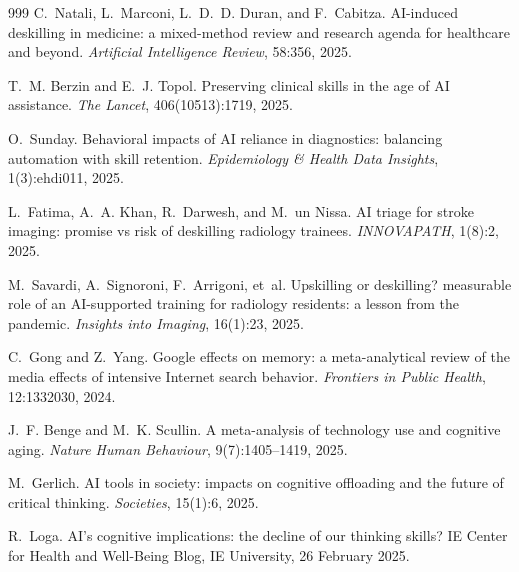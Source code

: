 \begin{thebibliography}{999}
C.~Natali, L.~Marconi, L.~D.~D. Duran, and F.~Cabitza.
\newblock AI-induced deskilling in medicine: a mixed-method review and research agenda for healthcare and beyond.
\newblock \emph{Artificial Intelligence Review}, 58:356, 2025.

T.~M. Berzin and E.~J. Topol.
\newblock Preserving clinical skills in the age of AI assistance.
\newblock \emph{The Lancet}, 406(10513):1719, 2025.

O.~Sunday.
\newblock Behavioral impacts of AI reliance in diagnostics: balancing automation with skill retention.
\newblock \emph{Epidemiology \& Health Data Insights}, 1(3):ehdi011, 2025.

L.~Fatima, A.~A. Khan, R.~Darwesh, and M.~un Nissa.
\newblock AI triage for stroke imaging: promise vs risk of deskilling radiology trainees.
\newblock \emph{INNOVAPATH}, 1(8):2, 2025.

M.~Savardi, A.~Signoroni, F.~Arrigoni, et~al.
\newblock Upskilling or deskilling? measurable role of an AI-supported training for radiology residents: a lesson from the pandemic.
\newblock \emph{Insights into Imaging}, 16(1):23, 2025.

C.~Gong and Z.~Yang.
\newblock Google effects on memory: a meta-analytical review of the media effects of intensive Internet search behavior.
\newblock \emph{Frontiers in Public Health}, 12:1332030, 2024.

J.~F. Benge and M.~K. Scullin.
\newblock A meta-analysis of technology use and cognitive aging.
\newblock \emph{Nature Human Behaviour}, 9(7):1405--1419, 2025.

M.~Gerlich.
\newblock AI tools in society: impacts on cognitive offloading and the future of critical thinking.
\newblock \emph{Societies}, 15(1):6, 2025.

R.~Loga.
\newblock AI's cognitive implications: the decline of our thinking skills?
\newblock IE Center for Health and Well-Being Blog, IE University, 26 February 2025.


\end{thebibliography}
